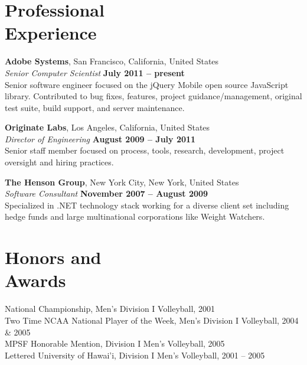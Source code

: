 \documentclass[margin,line]{resume}
\begin{document}
\begin{resume}
  \section{\mysidestyle Professional\\Experience}

  \textbf{Adobe Systems}, San Francisco, California, United States \vspace{2mm}\\\vspace{1mm}%
  \textsl{Senior Computer Scientist} \hfill \textbf{July 2011 -- present}\\
  Senior software engineer focused on the jQuery Mobile open source JavaScript library. Contributed to bug fixes, features, project guidance/management, original test suite, build support, and server maintenance.

  \textbf{Originate Labs}, Los Angeles, California, United States \vspace{2mm}\\\vspace{1mm}%
  \textsl{Director of Engineering} \hfill \textbf{August 2009 -- July 2011}\\
  Senior staff member focused on process, tools, research, development, project oversight and hiring practices.

  \textbf{The Henson Group}, New York City, New York, United States \vspace{2mm}\\\vspace{1mm}%
  \textsl{Software Consultant} \hfill \textbf{November 2007 -- August 2009}\\
  Specialized in .NET technology stack working for a diverse client set including hedge funds and large multinational corporations like Weight Watchers.

  \clearpage
  \section{\mysidestyle Honors and\\Awards}
  National Championship, Men's Division I Volleyball, 2001\vspace{1mm}\\
  Two Time NCAA National Player of the Week, Men's Division I Volleyball, 2004 \& 2005\vspace{1mm}\\
  MPSF Honorable Mention, Division I Men's Volleyball, 2005\vspace{1mm}\\
  Lettered University of Hawai'i, Division I Men's Volleyball, 2001 -- 2005 \vspace{1mm}\\


\end{resume}
\end{document}
